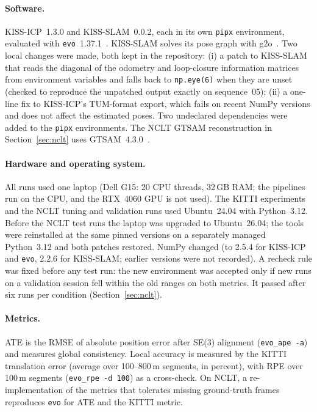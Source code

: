 \documentclass[11pt,a4paper]{article}
\begin{document}
\paragraph{Software.} KISS-ICP~1.3.0 and KISS-SLAM~0.0.2, each in its own \texttt{pipx} environment, evaluated with
\texttt{evo}~1.37.1~\cite{evo}. KISS-SLAM solves its pose graph with g2o~\cite{g2o}. Two local changes were made,
both kept in the repository: (i) a patch to KISS-SLAM that reads the diagonal of the odometry and loop-closure
information matrices from environment variables and falls back to \texttt{np.eye(6)} when they are unset (checked
to reproduce the unpatched output exactly on sequence~05); (ii) a one-line fix to KISS-ICP's TUM-format export,
which fails on recent NumPy versions and does not affect the estimated poses. Two undeclared dependencies were
added to the \texttt{pipx} environments. The NCLT GTSAM reconstruction in Section~\ref{sec:nclt} uses
GTSAM~4.3.0~\cite{gtsam}.

\paragraph{Hardware and operating system.} All runs used one laptop (Dell G15: 20 CPU threads, 32\,GB RAM; the
pipelines run on the CPU, and the RTX~4060 GPU is not used). The KITTI experiments and the NCLT tuning and
validation runs used Ubuntu~24.04 with Python~3.12. Before the NCLT test runs the laptop was upgraded to
Ubuntu~26.04; the tools were reinstalled at the same pinned versions on a separately managed Python~3.12 and both
patches restored. NumPy changed (to 2.5.4 for KISS-ICP and \texttt{evo}, 2.2.6 for KISS-SLAM; earlier versions
were not recorded). A recheck rule was fixed before any test run: the new environment was accepted only if
new runs on a validation session fell within the old ranges on both metrics. It passed after six runs per
condition (Section~\ref{sec:nclt}).

\paragraph{Metrics.} ATE is the RMSE of absolute position error after SE(3) alignment (\texttt{evo\_ape -a}) and
measures global consistency. Local accuracy is measured by the KITTI translation error (average over
100--800\,m segments, in percent), with RPE over 100\,m segments (\texttt{evo\_rpe -d 100}) as a cross-check. On
NCLT, a re-implementation of the metrics that tolerates missing ground-truth frames reproduces \texttt{evo} for
ATE and the KITTI metric.
\end{document}
